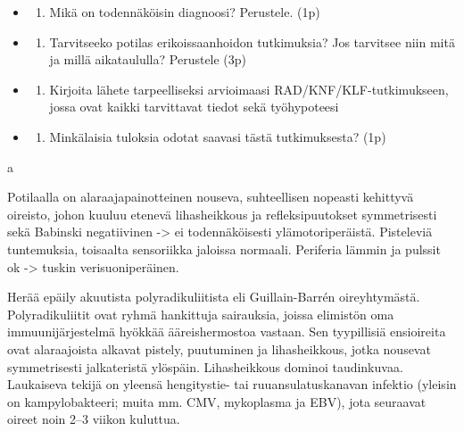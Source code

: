 \documentclass[
]{book}
\providecommand{\tightlist}{%
  \setlength{\itemsep}{0pt}\setlength{\parskip}{0pt}}
\begin{document}
\begin{itemize}
\tightlist
\item
  \begin{enumerate}
  \def\labelenumi{\alph{enumi}.}
  \tightlist
  \item
    Mikä on todennäköisin diagnoosi? Perustele. (1p)
  \end{enumerate}
\item
  \begin{enumerate}
  \def\labelenumi{\alph{enumi}.}
  \setcounter{enumi}{1}
  \tightlist
  \item
    Tarvitseeko potilas erikoissaanhoidon tutkimuksia? Jos tarvitsee niin mitä ja millä aikataululla? Perustele (3p)
  \end{enumerate}
\item
  \begin{enumerate}
  \def\labelenumi{\alph{enumi}.}
  \setcounter{enumi}{2}
  \tightlist
  \item
    Kirjoita lähete tarpeelliseksi arvioimaasi RAD/KNF/KLF-tutkimukseen, jossa ovat kaikki tarvittavat tiedot sekä työhypoteesi
  \end{enumerate}
\item
  \begin{enumerate}
  \def\labelenumi{\alph{enumi}.}
  \setcounter{enumi}{3}
  \tightlist
  \item
    Minkälaisia tuloksia odotat saavasi tästä tutkimuksesta? (1p)
  \end{enumerate}
\end{itemize}

a

Potilaalla on alaraajapainotteinen nouseva, suhteellisen nopeasti kehittyvä oireisto, johon kuuluu etenevä lihasheikkous ja refleksipuutokset symmetrisesti sekä Babinski negatiivinen -\textgreater{} ei todennäköisesti ylämotoriperäistä. Pisteleviä tuntemuksia, toisaalta sensoriikka jaloissa normaali. Periferia lämmin ja pulssit ok -\textgreater{} tuskin verisuoniperäinen.

Herää epäily akuutista polyradikuliitista eli Guillain-Barrén oireyhtymästä. Polyradikuliitit ovat ryhmä hankittuja sairauksia, joissa elimistön oma immuunijärjestelmä hyökkää ääreishermostoa vastaan. Sen tyypillisiä ensioireita ovat alaraajoista alkavat pistely, puutuminen ja lihasheikkous, jotka nousevat symmetrisesti jalkateristä ylöspäin. Lihasheikkous dominoi taudinkuvaa. Laukaiseva tekijä on yleensä hengitystie- tai ruuansulatuskanavan infektio (yleisin on kampylobakteeri; muita mm. CMV, mykoplasma ja EBV), jota seuraavat oireet noin 2--3 viikon kuluttua.
\end{document}
